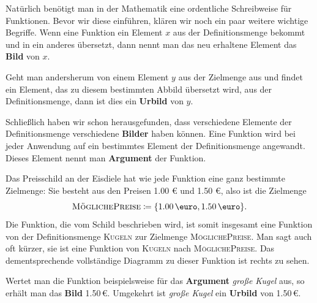 \documentclass[../../main.tex]{subfiles}
\begin{document}
Natürlich benötigt man in der Mathematik eine ordentliche Schreibweise für Funktionen. Bevor wir diese einführen, klären wir noch ein paar weitere wichtige Begriffe. Wenn eine Funktion ein Element $x$ aus der Definitionsmenge bekommt und in ein anderes übersetzt, dann nennt man das neu erhaltene Element das \textbf{Bild} von $x$.

Geht man andersherum von einem Element $y$ aus der Zielmenge aus und findet ein Element, das zu diesem bestimmten Abbild übersetzt wird, aus der Definitionsmenge, dann ist dies ein \textbf{Urbild} von $y$.

Schließlich haben wir schon herausgefunden, dass verschiedene Elemente der Definitionsmenge verschiedene \textbf{Bilder} haben können. Eine Funktion wird bei jeder Anwendung auf ein bestimmtes Element der Definitionsmenge angewandt. Dieses Element nennt man \textbf{Argument} der Funktion.

\begin{example}{}
    Das Preisschild an der Eisdiele hat wie jede Funktion eine ganz bestimmte Zielmenge: Sie besteht aus den Preisen 1.00 \euro{} und 1.50 \euro, also ist die Zielmenge \[\textsc{MöglichePreise}\coloneqq\{\text{1.00\,\euro},\text{1.50\,\euro}\}.\]
    Die Funktion, die vom Schild beschrieben wird, ist somit insgesamt eine Funktion von der Definitionsmenge \textsc{Kugeln} zur Zielmenge \textsc{MöglichePreise}. Man sagt auch oft kürzer, sie ist eine Funktion von \textsc{Kugeln} nach \textsc{MöglichePreise}. Das dementsprechende vollständige Diagramm zu dieser Funktion ist rechts zu sehen.
    
    Wertet man die Funktion beispielsweise für das \textbf{Argument} \emph{große Kugel} aus, so erhält man das \textbf{Bild} 1.50\,\euro. Umgekehrt ist \emph{große Kugel} ein \textbf{Urbild} von 1.50\,\euro.
\end{example}
\end{document}
